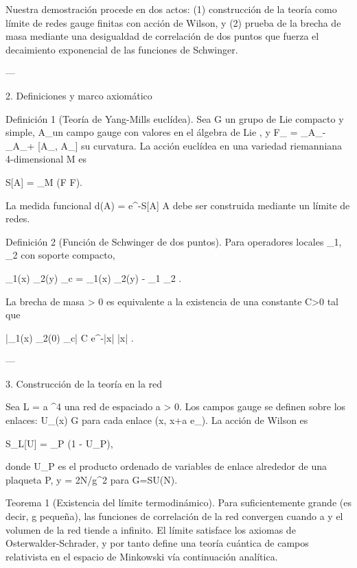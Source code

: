 \documentclass[12pt,twoside]{book}
\begin{document}
Nuestra demostración procede en dos actos: (1) construcción de la teoría como límite de redes gauge finitas con acción de Wilson, y (2) prueba de la brecha de masa mediante una desigualdad de correlación de dos puntos que fuerza el decaimiento exponencial de las funciones de Schwinger.

---

2. Definiciones y marco axiomático

Definición 1 (Teoría de Yang-Mills euclídea). Sea G un grupo de Lie compacto y simple, A_\mu un campo gauge con valores en el álgebra de Lie , y F_{\mu\nu} = \partial_\mu A_\nu - \partial_\nu A_\mu + [A_\mu, A_\nu] su curvatura. La acción euclídea en una variedad riemanniana 4-dimensional M es

S[A] =  \int_M (F \wedge *F).

La medida funcional d\mu(A) = e^{-S[A]} A debe ser construida mediante un límite de redes.

Definición 2 (Función de Schwinger de dos puntos). Para operadores locales _1, _2 con soporte compacto,

\langle {}_1(x) _2(y) \rangle_c = \langle {}_1(x) _2(y) \rangle - \langle {}_1 \rangle \langle {}_2 \rangle.

La brecha de masa \Delta > 0 es equivalente a la existencia de una constante C>0 tal que

|\langle {}_1(x) _2(0) \rangle_c| \le C e^{-\Delta |x|} \quad {} |x| \to \infty.

---

3. Construcción de la teoría en la red

Sea L = a ^4 una red de espaciado a > 0. Los campos gauge se definen sobre los enlaces: U_\mu(x) \in G para cada enlace (x, x+a e_\mu). La acción de Wilson es

S_L[U] = \beta \sum_P  (1 - U_P),

donde U_P es el producto ordenado de variables de enlace alrededor de una plaqueta P, y \beta = 2N/g^2 para G=SU(N).

Teorema 1 (Existencia del límite termodinámico). Para \beta suficientemente grande (es decir, g pequeña), las funciones de correlación de la red convergen cuando a  y el volumen de la red tiende a infinito. El límite satisface los axiomas de Osterwalder-Schrader, y por tanto define una teoría cuántica de campos relativista en el espacio de Minkowski vía continuación analítica.
\end{document}
